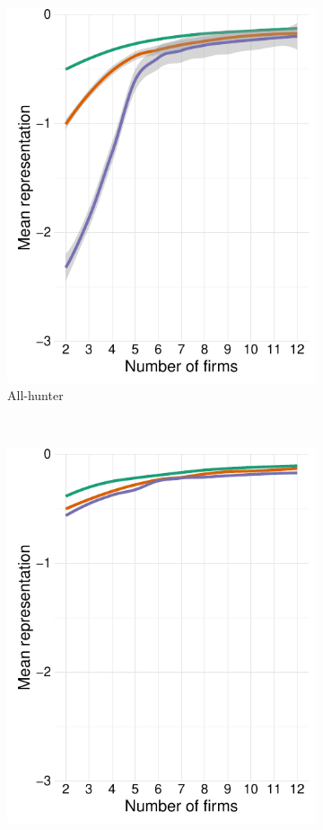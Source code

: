 \documentclass[preprint, 12pt]{elsarticle}
\begin{document}
\begin{figure}[ht!]
\begin{subfigure}[t]{0.315\textwidth}
		\includegraphics[width=\textwidth, trim={8mm 0 0 0}]{Graphics/fig323a_tall.pdf}
		\caption{All-hunter}
		\label{fig:representation_hunter}
	\end{subfigure}
	~
	\begin{subfigure}[t]{0.315\textwidth}
		\centering
		\includegraphics[width=\textwidth, trim={8mm 0 0 0}]{Graphics/fig343a_tall.pdf}

\end{subfigure}
\end{figure}
\end{document}
